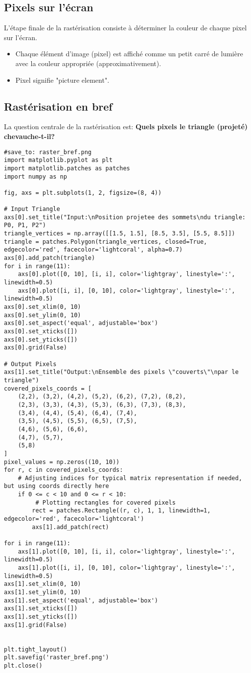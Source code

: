 \documentclass{article}
\begin{document}
\subsection{Pixels sur l'écran}
L'étape finale de la rastérisation consiste à déterminer la couleur de chaque pixel sur l'écran.
\begin{itemize}
    \item Chaque élément d'image (pixel) est affiché comme un petit carré de lumière avec la couleur appropriée (approximativement).
    \item Pixel signifie "picture element".
\end{itemize}

\subsection{Rastérisation en bref}
La question centrale de la rastérisation est: \textbf{Quels pixels le triangle (projeté) chevauche-t-il?}

\begin{verbatim}
#save_to: raster_bref.png
import matplotlib.pyplot as plt
import matplotlib.patches as patches
import numpy as np

fig, axs = plt.subplots(1, 2, figsize=(8, 4))

# Input Triangle
axs[0].set_title("Input:\nPosition projetee des sommets\ndu triangle: P0, P1, P2")
triangle_vertices = np.array([[1.5, 1.5], [8.5, 3.5], [5.5, 8.5]])
triangle = patches.Polygon(triangle_vertices, closed=True, edgecolor='red', facecolor='lightcoral', alpha=0.7)
axs[0].add_patch(triangle)
for i in range(11):
    axs[0].plot([0, 10], [i, i], color='lightgray', linestyle=':', linewidth=0.5)
    axs[0].plot([i, i], [0, 10], color='lightgray', linestyle=':', linewidth=0.5)
axs[0].set_xlim(0, 10)
axs[0].set_ylim(0, 10)
axs[0].set_aspect('equal', adjustable='box')
axs[0].set_xticks([])
axs[0].set_yticks([])
axs[0].grid(False)

# Output Pixels
axs[1].set_title("Output:\nEnsemble des pixels \"couverts\"\npar le triangle")
covered_pixels_coords = [
    (2,2), (3,2), (4,2), (5,2), (6,2), (7,2), (8,2),
    (2,3), (3,3), (4,3), (5,3), (6,3), (7,3), (8,3),
    (3,4), (4,4), (5,4), (6,4), (7,4),
    (3,5), (4,5), (5,5), (6,5), (7,5),
    (4,6), (5,6), (6,6),
    (4,7), (5,7),
    (5,8)
]
pixel_values = np.zeros((10, 10))
for r, c in covered_pixels_coords:
    # Adjusting indices for typical matrix representation if needed, but using coords directly here
    if 0 <= c < 10 and 0 <= r < 10:
         # Plotting rectangles for covered pixels
        rect = patches.Rectangle((r, c), 1, 1, linewidth=1, edgecolor='red', facecolor='lightcoral')
        axs[1].add_patch(rect)

for i in range(11):
    axs[1].plot([0, 10], [i, i], color='lightgray', linestyle=':', linewidth=0.5)
    axs[1].plot([i, i], [0, 10], color='lightgray', linestyle=':', linewidth=0.5)
axs[1].set_xlim(0, 10)
axs[1].set_ylim(0, 10)
axs[1].set_aspect('equal', adjustable='box')
axs[1].set_xticks([])
axs[1].set_yticks([])
axs[1].grid(False)


plt.tight_layout()
plt.savefig('raster_bref.png')
plt.close()
\end{verbatim}
\end{document}
